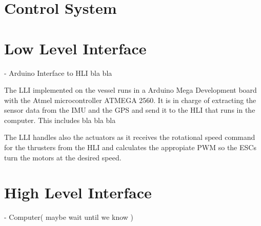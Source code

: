 \section{Control System}\label{sec:ControlComputation}

\section{Low Level Interface} - Arduino Interface to HLI bla bla

The LLI implemented on the vessel runs in a Arduino Mega Development board with the Atmel microcontroller ATMEGA 2560. It is in charge of extracting the sensor data from the IMU and the GPS and send it to the HLI that runs in the computer. This includes bla bla bla

The LLI handles also the actuators as it receives the rotational speed command for the thrusters from the HLI and calculates the appropiate PWM so the ESCs turn the motors at the desired speed.

\section{High Level Interface} - Computer( maybe wait until we know )



